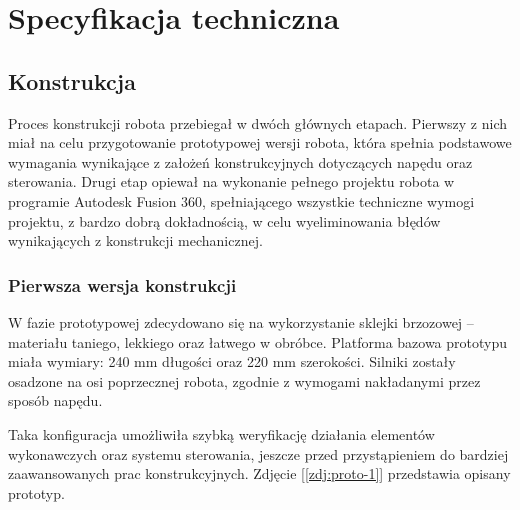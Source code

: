 \chapter{Specyfikacja techniczna}
\label{ch:06}

\section{Konstrukcja}
Proces konstrukcji robota przebiegał w dwóch głównych etapach. Pierwszy z nich miał na celu przygotowanie prototypowej wersji robota, która spełnia podstawowe wymagania wynikające z założeń konstrukcyjnych dotyczących napędu oraz sterowania. Drugi etap opiewał na wykonanie pełnego projektu robota w programie Autodesk Fusion 360, spełniającego wszystkie techniczne wymogi projektu, z bardzo dobrą dokładnością, w celu wyeliminowania błędów wynikających z konstrukcji mechanicznej.

\subsection{Pierwsza wersja konstrukcji}

W fazie prototypowej zdecydowano się na wykorzystanie sklejki brzozowej – materiału taniego, lekkiego oraz łatwego w obróbce. Platforma bazowa prototypu miała wymiary: 240 mm długości oraz 220 mm szerokości. Silniki zostały osadzone na osi poprzecznej robota, zgodnie z wymogami nakładanymi przez sposób napędu. 

Taka konfiguracja umożliwiła szybką weryfikację działania elementów wykonawczych oraz systemu sterowania, jeszcze przed przystąpieniem do bardziej zaawansowanych prac konstrukcyjnych. Zdjęcie [\ref{zdj:proto-1}] przedstawia opisany prototyp. 

